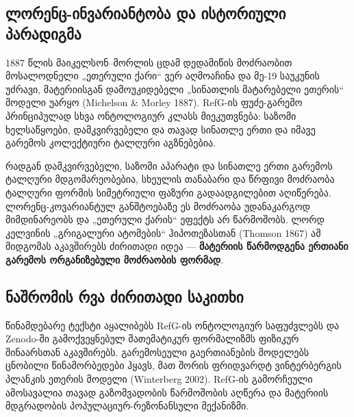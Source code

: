\documentclass[11pt,a4paper]{article}
\begin{document}
\subsection*{ლორენც-ინვარიანტობა და ისტორიული პარადიგმა}

1887 წლის მაიკელსონ–მორლის ცდამ დედამიწის მოძრაობით მოსალოდნელი „ეთერული ქარი“ ვერ აღმოაჩინა და მე-19 საუკუნის უძრავი, მატერიისგან დამოუკიდებელი „სინათლის მატარებელი ეთერის“ მოდელი უარყო (Michelson \& Morley 1887). RefG-ის ფუძე-გარემო პრინციპულად სხვა ონტოლოგიურ კლასს მიეკუთვნება: საზომი ხელსაწყოები, დამკვირვებელი და თავად სინათლე ერთი და იმავე გარემოს კოლექტიური ტალღური აგზნებებია.

რადგან დამკვირვებელი, საზომი აპარატი და სინათლე ერთი გარემოს ტალღური მდგომარეობებია, სხეულის თანაბარი და წრფივი მოძრაობა ტალღური ფორმის სიმეტრიული ფაზური გადაადგილებით აღიწერება. ლორენც-კოვარიანტულ განშტოებაზე ეს მოძრაობა უდანაკარგოდ მიმდინარეობს და „ეთერული ქარის“ ეფექტს არ წარმოშობს. ლორდ კელვინის „გრიგალური ატომების“ ჰიპოთეზასთან (Thomson 1867) ამ მიდგომას აკავშირებს ძირითადი იდეა — \textbf{მატერიის წარმოდგენა ერთიანი გარემოს ორგანიზებული მოძრაობის ფორმად}.

\newpage
\subsection*{ნაშრომის რვა ძირითადი საკითხი}

წინამდებარე ტექსტი აყალიბებს RefG-ის ონტოლოგიურ საფუძვლებს და Zenodo-ში გამოქვეყნებულ მათემატიკურ ფორმალიზმს ფიზიკურ შინაარსთან აკავშირებს. გარემოსეული გაერთიანების მოდელებს ცნობილი წინამორბედები ჰყავს, მათ შორის ფრიდვარდტ ვინტერბერგის პლანკის ეთერის მოდელი (Winterberg 2002). RefG-ის გამორჩეული ამოსავალია თავად გაზომვადობის წარმოშობის აღწერა და მატერიის მდგრადობის პოპულაციურ-რეზონანსული მექანიზმი.
\end{document}

